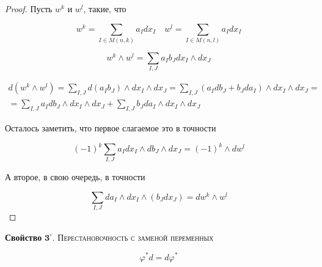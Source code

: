 \documentclass[a5paper]{article}
\theoremstyle{plain}
\theoremstyle{definition}
\numberwithin{through}{section}
\numberwithin{equation}{section}
\begin{document}
\begin{proof}

Пусть $w^k$ и $w^l$, такие, что

\begin{equation*}
	w^k = \sum\limits_{I \in M(n, k)} a_I dx_I \quad w^l = \sum\limits_{I \in M(n, l)} a_I dx_I
\end{equation*}

\begin{equation*}
	w^k \wedge w^l = \sum\limits_{I, J} a_I b_J dx_I \wedge dx_J
\end{equation*}

\begin{multline*}
	d(w^k \wedge w^l) = \sum\limits_{I, J} d(a_I b_J) \wedge dx_I \wedge dx_J = \sum\limits_{I,J} (a_I db_J + b_J da_I) \wedge dx_I \wedge dx_J = \\ = \sum\limits_{I,J} a_I db_J \wedge dx_I \wedge dx_J +  \sum\limits_{I,J} b_J da_I \wedge dx_I \wedge dx_J
\end{multline*}

Осталось заметить, что первое слагаемое это в точности

\begin{equation*}
	(-1)^k \sum\limits_{I, J} a_I dx_I \wedge db_J \wedge dx_J = (-1)^k \wedge dw^l
\end{equation*}

А второе, в свою очередь, в точности

\begin{equation*}
	\sum\limits_{I, J} da_I \wedge dx_I \wedge (b_J dx_J) = dw^k \wedge w^l
\end{equation*}

\end{proof}

\medskip
{\bf Свойство} $\mathbf{3^\circ.}$
{\textsc{Перестановочность с заменой переменных}}

\begin{equation*}
	\varphi^* d = d \varphi^*
\end{equation*}
\end{document}
